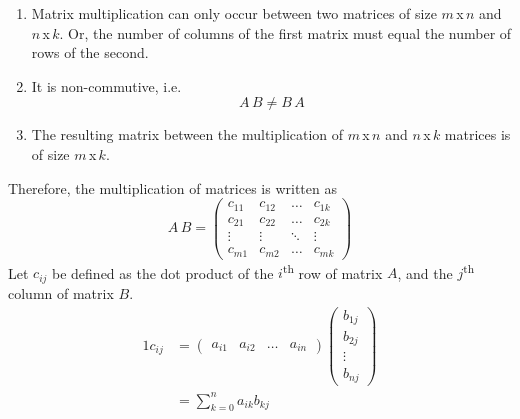 \documentclass[diffeq.tex]{subfiles}
\begin{document}
    \begin{definition}
        \begin{enumerate}
            \item Matrix multiplication can only occur between two matrices of size $m$\,x\,$n$ and $n$\,x\,$k$. Or, the number of columns of the first matrix must equal the number of rows of the second.
            \item It is non-commutive, i.e.
            \begin{equation}
                A\, B \neq B\, A
            \end{equation}
            \item The resulting matrix between the multiplication of $m$\,x\,$n$ and $n$\,x\,$k$ matrices is of size $m$\,x\,$k$.
        \end{enumerate}
        \noindent Therefore, the multiplication of matrices is written as
        \begin{equation}
            A\, B = \begin{pmatrix}
                c_{11} & c_{12} & \dots & c_{1k}\\
                c_{21} & c_{22} & \dots & c_{2k}\\
                \vdots & \vdots & \ddots & \vdots\\
                c_{m1} & c_{m2} & \dots & c_{mk}
            \end{pmatrix}
        \end{equation}
        Let $c_{ij}$ be defined as the dot product of the $i$\textsuperscript{th} row of matrix $A$, and the $j$\textsuperscript{th} column of matrix $B$.
        \begin{alignat}{1}
            c_{ij} &= \begin{pmatrix}
                a_{i1} & a_{i2} & \dots & a_{in}
            \end{pmatrix}
            \begin{pmatrix}
                b_{1j} \\
                b_{2j} \\
                \vdots \\
                b_{nj}
            \end{pmatrix}\\
            &= \sum_{k = 0}^{n}a_{ik}b_{kj}
        \end{alignat}
    \end{definition}
    \np
\end{document}
